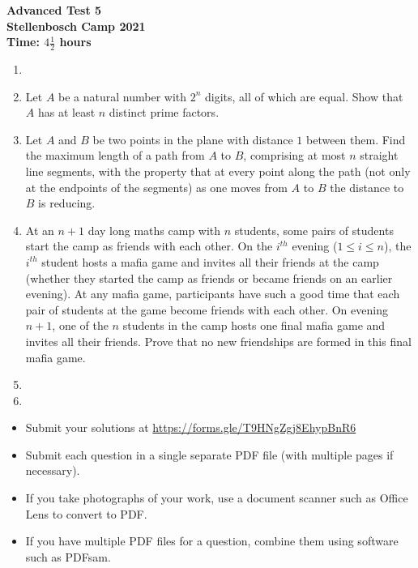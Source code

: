 \documentclass{article}
\begin{document}
\thispagestyle{empty}

\begin{center}
  \textbf{\Large Advanced Test 5}
  \\ \vspace{1em}
  \textbf{\large Stellenbosch Camp 2021}
  \\ \vspace{1em}
  \textbf{\large Time: $4\frac{1}{2}$ hours}
\end{center}

\bigskip

\begin{enumerate}[itemsep=\fill]

\item %


\item %
Let $A$ be a natural number with $2^n$ digits, all of which are equal. Show that $A$ has at least $n$ distinct prime factors.


\item %
Let $A$ and $B$ be two points in the plane with distance $1$ between them.
Find the maximum length of a path from $A$ to $B$, comprising at most $n$ straight line segments, with the property that at every point along the path (not only at the endpoints of the segments) as one moves from $A$ to $B$ the distance to $B$ is reducing.


\item %
At an $n+1$ day long maths camp with $n$ students, some pairs of students start the camp as friends with each other. On the $i^{th}$ evening ($1 \leq i \leq n$), the $i^{th}$ student hosts a mafia game and invites all their friends at the camp (whether they started the camp as friends or became friends on an earlier evening). At any mafia game, participants have such a good time that each pair of students at the game become friends with each other. On evening $n+1$, one of the $n$ students in the camp hosts one final mafia game and invites all their friends. Prove that no new friendships are formed in this final mafia game.


\item %


\item %

\end{enumerate}


\vfill
\small
\begin{itemize}
	\item Submit your solutions at \href{https://forms.gle/T9HNgZgj8EhypBnR6}{https://forms.gle/T9HNgZgj8EhypBnR6}
	\item Submit each question in a single separate PDF file (with multiple pages if necessary).
	\item If you take photographs of your work, use a document scanner such as Office Lens to convert to PDF.
	\item If you have multiple PDF files for a question, combine them using software such as PDFsam.
\end{itemize}
\end{document}

